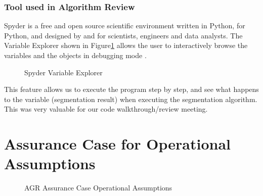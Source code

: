 \subsubsection{Tool used in Algorithm Review}

Spyder is a free and open source scientific environment written in Python, for Python, and designed by and for scientists, engineers and data analysts. The Variable Explorer shown in Figure\ref{fig_spyder_ve} allows the user to interactively browse the variables and the objects in debugging mode \cite{raybaut2009spyder}.

\begin{figure}[H]
    \centering
    \caption[Spyder Variable Explorer]{Spyder Variable Explorer \cite{raybaut2009spyder}}
    \label{fig_spyder_ve}
\end{figure}

This feature allows us to execute the program step by step, and see what happens to the variable (segmentation result) when executing the segmentation algorithm. This was very valuable for our code walkthrough/review meeting.

\section{Assurance Case for Operational Assumptions}

\begin{figure}[H]
    \centering
    \caption[AGR Assurance Case Operational Assumptions]{AGR Assurance Case Operational Assumptions}
    \label{fig_agr_ac_gba}
\end{figure}

